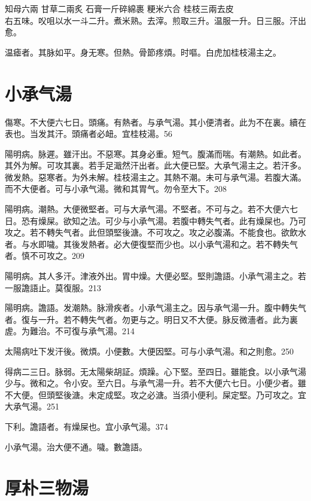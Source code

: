 知母{\scriptsize 六兩} 甘草{\scriptsize 二兩炙} 石膏{\scriptsize 一斤碎綿裹} 粳米{\scriptsize 六合} 桂枝{\scriptsize 三兩去皮}\\
右五味。㕮咀以水一斗二升。煮米熟。去滓。煎取三升。温服一升。日三服。汗出愈。

温瘧者。其脉如平。身无寒。但熱。骨節疼煩。时嘔。白虎加桂枝湯主之。

\section{小承气湯}

傷寒。不大便六七日。頭痛。有熱者。与承气湯。其小便清者。此为不在裏。續在表也。当发其汗。頭痛者必衄。宜桂枝湯。56

陽明病。脉遲。雖汗出。不惡寒。其身必重。短气。腹滿而喘。有潮熱。如此者。其外为解。可攻其裏。若手足濈然汗出者。此大便已堅。{\khaaitp 大}承气湯主之。若汗多。微发熱。惡寒者。为外未解。{\khaaitp 桂枝湯主之。}其熱不潮。未可与承气湯。若腹大滿。而不大便者。可与小承气湯。微和其胃气。勿令至大下。208

陽明病。潮熱。大便微堅者。可与{\khaaitp 大}承气湯。不堅者。不可与之。若不大便六七日。恐有燥屎。欲知之法。可少与小承气湯。若腹中轉失气者。此有燥屎也。乃可攻之。若不轉失气者。此但頭堅後溏。不可攻之。攻之必腹滿。不能食也。欲飲水者。与水即噦。其後发熱者。必大便復堅而少也。以小承气湯和之。若不轉失气者。慎不可攻之。209

陽明病。其人多汗。津液外出。胃中燥。大便必堅。堅則譫語。{\khaaitp 小}承气湯主之。{\khaaitp 若一服譫語止。莫復服。}213

陽明病。譫語。发潮熱。脉滑疾者。{\khaaitp 小}承气湯主之。因与承气湯一升。腹中轉失气者。復与一升。若不轉失气者。勿更与之。明日又不大便。脉反微濇者。此为裏虗。为難治。不可復与承气湯。214

太陽病吐下发汗後。微煩。小便數。大便因堅。可与小承气湯。和之則愈。250

得病二三日。脉弱。无太陽柴胡証。煩躁。心下堅。至四日。雖能食。以{\khaaitp 小}承气湯少与。微和之。令小安。至六日。与承气湯一升。若不大便六七日。小便少者。雖不大便。但頭堅後溏。未定成堅。攻之必溏。当須小便利。屎定堅。乃可攻之。宜{\khaaitp 大}承气湯。251

下利。譫語者。有燥屎也。宜{\khaaitp 小}承气湯。374

小承气湯。治大便不通。噦。數譫語。

\section{厚朴三物湯}

